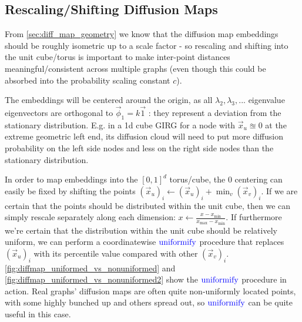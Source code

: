 \subsection{Rescaling/Shifting Diffusion Maps}
From \cref{sec:diff_map_geometry} we know that the diffusion map embeddings should be roughly isometric up to a scale factor - so rescaling and shifting into the unit cube/torus is important to make inter-point distances meaningful/consistent across multiple graphs (even though this could be absorbed into the probability scaling constant $c$).


The embeddings will be centered around the origin, as all $\lambda_2, \lambda_3, ...$ eigenvalue eigenvectors are orthogonal to $\vec{\phi}_1 = k \vec{1}$ : they represent a deviation from the stationary distribution. E.g. in a 1d cube GIRG for a node with $\vec{x}_u \approxeq 0$ at the extreme geometric left end, its diffusion cloud will need to put more diffusion probability on the left side nodes and less on the right side nodes than the stationary distribution.


In order to map embeddings into the $[0, 1]^d$ torus/cube, the 0 centering can easily be fixed by shifting the points $(\vec{x}_u)_i \gets (\vec{x}_u)_i + \min_v (\vec{x}_v)_i$.
If we are certain that the points should be distributed within the unit cube, then we can simply rescale separately along each dimension: $x \gets \frac{x - x_{\min}}{x_{\max} - x_{\min}}$.
If furthermore we're certain that the distribution within the unit cube should be relatively uniform, we can perform a coordinatewise $\operatorname{\textcolor{blue}{uniformify}}$ procedure that replaces $(\vec{x}_u)_i$ with its percentile value compared with other $(\vec{x}_v)_i$. \cref{fig:diffmap_uniformed_vs_nonuniformed} and \cref{fig:diffmap_uniformed_vs_nonuniformed2} show the $\operatorname{\textcolor{blue}{uniformify}}$ procedure in action.
Real graphs' diffusion maps are often quite non-uniformly located points, with some highly bunched up and others spread out, so $\operatorname{\textcolor{blue}{uniformify}}$ can be quite useful in this case.



